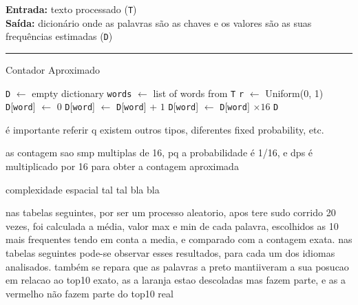 \documentclass[mirror, portugues]{revdetua}
\begin{document}
\begin{algorithm}[H]
\raggedright
\textbf{Entrada:} texto processado (\texttt{T}) \\
\textbf{Saída:} dicionário onde as palavras são as chaves e os valores são as suas frequências estimadas (\texttt{D})\\
\hrule 
\caption{Contador Aproximado}
\begin{algorithmic}[1]
    \State \texttt{D} $\gets$ empty dictionary
    \State \texttt{words} $\gets$ list of words from \texttt{T}
    \State \texttt{r} $\gets$ Uniform(0, 1)
            \State \texttt{D}[\texttt{word}] $\gets$ 0
        \EndIf
        \State \texttt{D}[\texttt{word}] $\gets$ \texttt{D}[\texttt{word}] + $1$
    \EndIf
    \EndFor
     
    \State \texttt{D}[\texttt{word}] $\gets$ \texttt{D}[\texttt{word}] $\times 16$
    \EndFor
    \State \Return \texttt{D}
\end{algorithmic}
\end{algorithm}

é importante referir q existem outros tipos, diferentes fixed probability, etc.

as contagem sao smp multiplas de 16, pq a probabilidade é 1/16, e dps é multiplicado por 16 para obter a contagem aproximada

complexidade espacial tal tal bla bla

nas tabelas seguintes, por ser um processo aleatorio, apos tere sudo corrido 20 vezes, foi calculada a média, valor max e min de cada palavra, escolhidos as 10 mais frequentes tendo em conta a media, e comparado com a contagem exata. nas tabelas seguintes pode-se observar esses resultados, para cada um dos idiomas analisados. também se repara que as palavras a preto mantiiveram a sua posucao em relacao ao top10 exato, as a laranja estao descoladas mas fazem parte, e as a vermelho não fazem parte do top10 real
\end{document}
